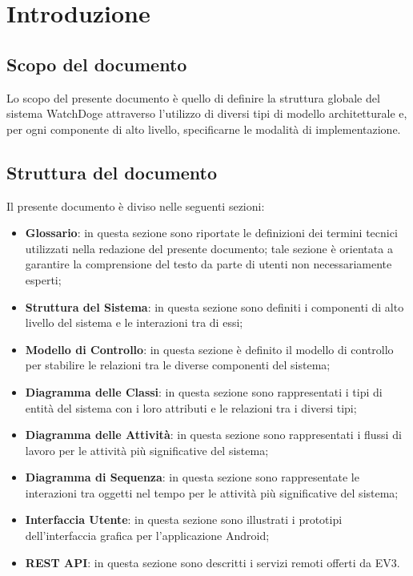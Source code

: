 \documentclass{article}
\begin{document}
%
%

\tableofcontents

\pagebreak
  
\section{Introduzione}

\subsection{Scopo del documento}

Lo scopo del presente documento è quello di definire la struttura globale del sistema WatchDoge attraverso l'utilizzo di diversi tipi di modello architetturale e, per ogni componente di alto livello, specificarne le modalità di implementazione.

\subsection{Struttura del documento}

Il presente documento è diviso nelle seguenti sezioni:
\begin{itemize}
    \item \textbf{Glossario}: in questa sezione sono riportate le definizioni dei termini tecnici utilizzati nella redazione del presente documento; tale sezione è orientata a garantire la comprensione del testo da parte di utenti non necessariamente esperti;
    \item \textbf{Struttura del Sistema}: in questa sezione sono definiti i componenti di alto livello del sistema e le interazioni tra di essi;
    \item \textbf{Modello di Controllo}: in questa sezione è definito il modello di controllo per stabilire le relazioni tra le diverse componenti del sistema;
    \item \textbf{Diagramma delle Classi}: in questa sezione sono rappresentati i tipi di entità del sistema con i loro attributi e le relazioni tra i diversi tipi;
    \item \textbf{Diagramma delle Attività}: in questa sezione sono rappresentati i flussi di lavoro per le attività più significative del sistema;
    \item \textbf{Diagramma di Sequenza}: in questa sezione sono rappresentate le interazioni tra oggetti nel tempo per le attività più significative del sistema;
    \item \textbf{Interfaccia Utente}: in questa sezione sono illustrati i prototipi dell'interfaccia grafica per l'applicazione Android;
    \item \textbf{REST API}: in questa sezione sono descritti i servizi remoti offerti da EV3.
\end{itemize}
\end{document}
